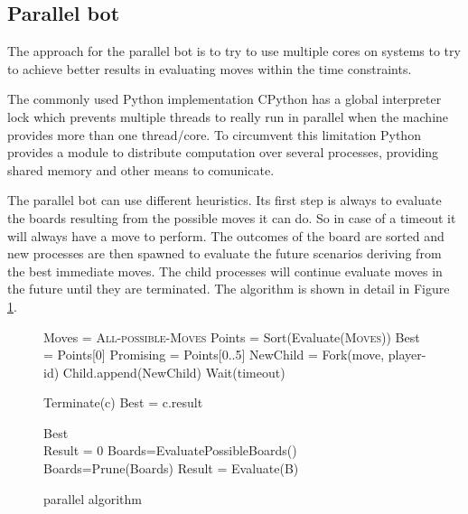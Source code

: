 \subsection{Parallel bot}
\label{parallel}

The approach for the parallel bot is to try to use multiple cores on systems to try to achieve better results in evaluating moves within the time constraints.

The commonly used Python implementation CPython has a global interpreter lock which prevents multiple threads to really run in parallel when the machine provides more than one thread/core\cite{pygil}. To circumvent this limitation Python provides a module to distribute computation over several processes, providing shared memory and other means to comunicate.

The parallel bot can use different heuristics. Its first step is always to evaluate the boards resulting from the possible moves it can do. So in case of a timeout it will always have a move to perform.
The outcomes of the board are sorted and new processes are then spawned to evaluate the future scenarios deriving from the best immediate moves.
The child processes will continue evaluate moves in the future until they are terminated.
The algorithm is shown in detail in Figure \ref{parallel_algorithm}.

\begin{figure}
\begin{algorithmic}
    \State Moves = \textsc{All-possible-Moves}
    \State Points = Sort(Evaluate(\textsc{Moves}))
    \State Best = Points[0]
    \State Promising = Points[0..5]
        \State NewChild = Fork(move, player-id)
        \State Child.append(NewChild)
    \EndFor
    \State Wait(timeout)

        \State Terminate(c)
            \State Best = c.result
        \EndIf
    \EndFor

    \State \Return Best
\EndFunction
\\
    \State Result = 0
            \State Boards=EvaluatePossibleBoards()
            \State Boards=Prune(Boards)
                    \State Result = Evaluate(B)
                \EndIf
            \EndFor
        \EndFor
    \EndWhile
\EndFunction

\end{algorithmic}
\caption{parallel algorithm}
\label{parallel_algorithm}
\end{figure}
